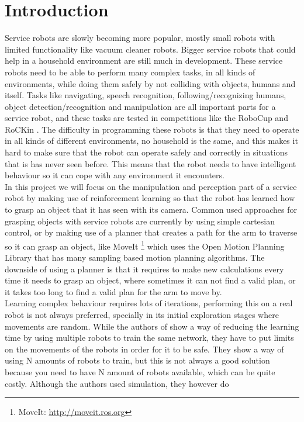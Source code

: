 \section{Introduction}
Service robots are slowly becoming more popular, mostly small robots with limited functionality like vacuum cleaner robots. Bigger service robots that could help in a household environment are still much in development. 
These service robots need to be able to perform many complex tasks, in all kinds of environments, while doing them safely by not colliding with objects, humans and itself.   
Tasks like navigating, speech recognition, following/recognizing humans, object detection/recognition and manipulation are all important parts for a service robot, 
and these tasks are tested in competitions like the RoboCup \cite{robocup} and RoCKin \cite{rockin}. The difficulty in programming these robots is that they need to operate in all kinds of different environments, no household is the same, 
and this makes it hard to make sure that the robot can operate safely and correctly in situations that is has never seen before. This means that the robot needs to have intelligent behaviour so it can cope with any environment it encounters. \\
In this project we will focus on the manipulation and perception part of a service robot by making use of reinforcement learning so that the robot has learned how to grasp an object that it has seen with its camera.  
Common used approaches for grasping objects with service robots are currently by using simple cartesian control, or by making use of a planner that creates a path for the arm to traverse so it can grasp an object, 
like MoveIt \footnote{MoveIt: \url{http://moveit.ros.org}} which uses the Open Motion Planning Library \cite{ompl} that has many sampling based motion planning algorithms. 
The downside of using a planner is that it requires to make new calculations every time it needs to grasp an object, where sometimes it can not find a valid plan, or it takes too long to find a valid plan
for the arm to move by. \\
Learning complex behaviour requires lots of iterations, performing this on a real robot is not always preferred, specially in its initial exploration stages where movements are random. 
While the authors of \cite{gu2016deep} show a way of reducing the learning time by using multiple robots to train the same network, they have to put limits on the movements of the robots in order for it to be safe. 
They show a way of using N amounts of robots to train, but this is not always a good solution because you need to have N amount of robots available, which can be quite costly. Although the authors used simulation, they however do 
